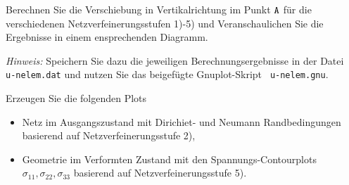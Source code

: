 \enab
  \item Berechnen Sie die Verschiebung in Vertikalrichtung im Punkt $\tt A$ für die verschiedenen Netzverfeinerungsstufen 1)-5) und Veranschaulichen Sie die Ergebnisse in einem ensprechenden Diagramm.

  \textit{Hinweis:} Speichern Sie dazu die jeweiligen Berechnungsergebnisse in der Datei \verb| u-nelem.dat| und nutzen Sie das beigefügte Gnuplot-Skript \verb| u-nelem.gnu|.
  \item Erzeugen Sie die folgenden Plots
  \begin{itemize}
    \item Netz im Ausgangszustand mit Dirichiet- und Neumann Randbedingungen basierend auf Netzverfeinerungsstufe 2),
    \item Geometrie im Verformten Zustand mit den Spannungs-Contourplots $\sigma_{11}, \sigma_{22}, \sigma_{33}$ basierend auf Netzverfeinerungsstufe 5).
  \end{itemize}
\enae


% 
% 
% 

